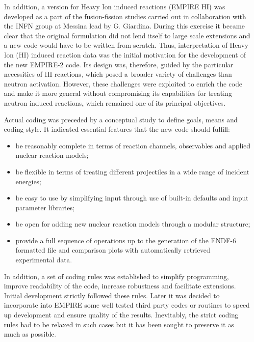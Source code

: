 In addition, a version for Heavy Ion induced reactions (EMPIRE HI) was
developed as a part of the fusion-fission studies carried out in
collaboration with the INFN group at Messina lead by G. Giardina. During
this exercise it became clear that the original formulation did not lend
itself to large scale extensions and a new code would have to be written from
scratch. Thus, interpretation of Heavy Ion (HI) induced reaction data was
the initial motivation for the development of the new EMPIRE-2 code. Its
design was, therefore, guided by the particular necessities of HI
reactions, which posed a
broader variety of challenges than neutron activation. However, these
challenges were exploited to enrich the code and make it more general
without compromising its capabilities for treating neutron induced reactions,
which remained one of its principal objectives.

Actual coding was preceded by a conceptual study to define goals, means and
coding style. It indicated essential features that the new code should
fulfill:

\begin{itemize}
\item be reasonably complete in terms of reaction channels, observables and
applied nuclear reaction models;

\item be flexible in terms of treating different projectiles in a wide range
of incident energies;

\item be easy to use by simplifying input through use of built-in defaults
and input parameter libraries;

\item be open for adding new nuclear reaction models through a modular
structure;

\item provide a full sequence of operations up to the generation of the
ENDF-6 formatted file and comparison plots with automatically retrieved
experimental data.
\end{itemize}

In addition, a set of coding rules was established to simplify programming,
improve readability of the code, increase robustness and facilitate
extensions. Initial development strictly followed these rules. Later it was
decided to incorporate into EMPIRE some well tested third party codes or
routines to speed up development and ensure quality of the results.
Inevitably, the strict coding rules had to be relaxed in such cases but it
has been sought to preserve it as much as possible.

